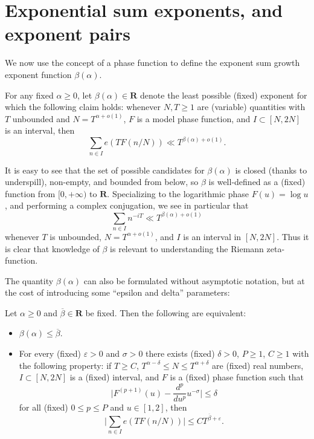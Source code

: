 \documentclass[a4paper, 10pt]{amsart}
\newcommand{\eps}{\varepsilon}
\newcommand{\R}{\mathbf{R}}
\begin{document}
\section{Exponential sum exponents, and exponent pairs}

We now use the concept of a phase function to define the exponent sum growth exponent function $\beta(\alpha)$.

    \begin{definition}\label{beta-def}  For any fixed $\alpha \geq 0$, let $\beta(\alpha) \in \R$ denote the least possible (fixed) exponent for which the following claim holds: whenever $N, T \geq 1$ are (variable) quantities with $T$ unbounded and $N = T^{\alpha+o(1)}$, $F$ is a model phase function, and $I \subset [N, 2N]$ is an interval, then
        $$ \sum_{n \in I} e(T F(n/N)) \ll T^{\beta(\alpha)+o(1)}.$$
    \end{definition}

    It is easy to see that the set of possible candidates for $\beta(\alpha)$ is closed (thanks to underspill), non-empty, and bounded from below, so $\beta$ is well-defined as a (fixed) function from $[0,+\infty)$ to $\R$.  Specializing to the logarithmic phase $F(u) = \log u$, and performing a complex conjugation, we see in particular that
\begin{equation*}\label{beta-alpha}
    \sum_{n \in I} n^{-iT} \ll T^{\beta(\alpha)+o(1)}
\end{equation*}
whenever $T$ is unbounded, $N = T^{\alpha+o(1)}$, and $I$ is an interval in $[N,2N]$.  Thus it is clear that knowledge of $\beta$ is  relevant to understanding the Riemann zeta-function.

The quantity $\beta(\alpha)$ can also be formulated without asymptotic notation, but at the cost of introducing some ``epsilon and delta'' parameters:

\begin{lemma}\label{beta-asymp}  Let $\alpha \geq 0$ and $\overline{\beta} \in \R$ be fixed.  Then the following are equivalent:
\begin{itemize}
\item[(i)] $\beta(\alpha) \leq \overline{\beta}$.
\item[(ii)] For every (fixed) $\eps>0$ and $\sigma > 0$ there exists (fixed) $\delta>0$, $P \geq 1$, $C \geq 1$ with the following property: if $T \geq C$, $T^{\alpha-\delta} \leq N \leq T^{\alpha+\delta}$ are (fixed) real numbers, $I \subset [N,2N]$ is a (fixed) interval, and $F$ is a (fixed) phase function such that
\begin{equation}\label{fpu-bound}
\bigg|F^{(p+1)}(u) - \frac{d^p}{du^p} u^{-\sigma}\bigg| \leq \delta
\end{equation}
for all (fixed) $0 \leq p \leq P$ and $u \in [1,2]$, then
$$ \bigg|\sum_{n \in I} e(T F(n/N))\bigg| \leq C T^{\overline{\beta}+\eps}.$$
\end{itemize}
\end{lemma}
\end{document}
